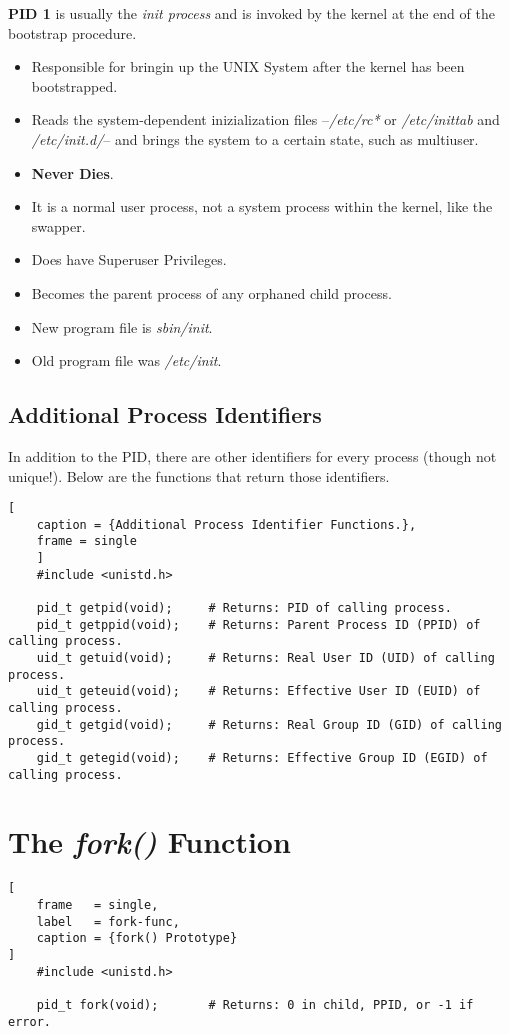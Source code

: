 \documentclass{article}
\newcommand\be[1]{\textbf{\emph{#1}}}
\begin{document}
\textbf{PID 1} is usually the \emph{init process} and is invoked
by the kernel at the end of the bootstrap procedure.
\begin{itemize}
    \item Responsible for bringin up the UNIX System after 
        the kernel has been bootstrapped.
    \item Reads the system-dependent inizialization files 
        --\emph{/etc/rc*} or \emph{/etc/inittab} and 
        \emph{/etc/init.d/}-- and brings the system to a 
        certain state, such as multiuser.
    \item \textbf{Never Dies}.
    \item It is a normal user process, not a system process 
        within the kernel, like the swapper.
    \item Does have Superuser Privileges.
    \item Becomes the parent process of any orphaned child process.
    \item New program file is \emph{sbin/init}.
    \item Old program file was \emph{/etc/init}. \\
\end{itemize}


\subsection{Additional Process Identifiers}
In addition to the PID, there are other identifiers for every 
process (though not unique!). Below are the functions that 
return those identifiers.\newline

\newpage
\begin{lstlisting}[
    caption = {Additional Process Identifier Functions.},
    frame = single
    ]
    #include <unistd.h>

    pid_t getpid(void);     # Returns: PID of calling process.
    pid_t getppid(void);    # Returns: Parent Process ID (PPID) of calling process.
    uid_t getuid(void);     # Returns: Real User ID (UID) of calling process.
    uid_t geteuid(void);    # Returns: Effective User ID (EUID) of calling process.
    gid_t getgid(void);     # Returns: Real Group ID (GID) of calling process.
    gid_t getegid(void);    # Returns: Effective Group ID (EGID) of calling process.
\end{lstlisting}

\section{The \be{fork()} Function}
\begin{lstlisting}[
    frame   = single,
    label   = fork-func,
    caption = {fork() Prototype}
]
    #include <unistd.h>

    pid_t fork(void);       # Returns: 0 in child, PPID, or -1 if error.
\end{lstlisting}
\end{document}
